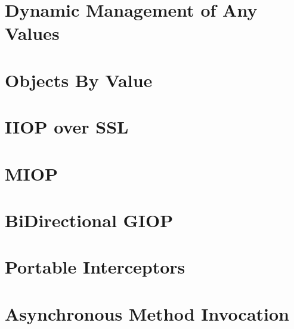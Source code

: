 \documentclass[12pt]{scrbook}
\begin{document}
\chapter{Dynamic Management of Any Values}
\label{ch:dynany}



\chapter{Objects By Value}
\label{ch:obv}




\chapter{IIOP over SSL}
\label{ch:SSL}




\chapter{MIOP}
\label{ch:miop}




\chapter{BiDirectional GIOP}
\label{ch:bidir}




\chapter{Portable Interceptors}
\label{ch:pi}




\chapter{Asynchronous Method Invocation}
\label{ch:AMI}
\end{document}
